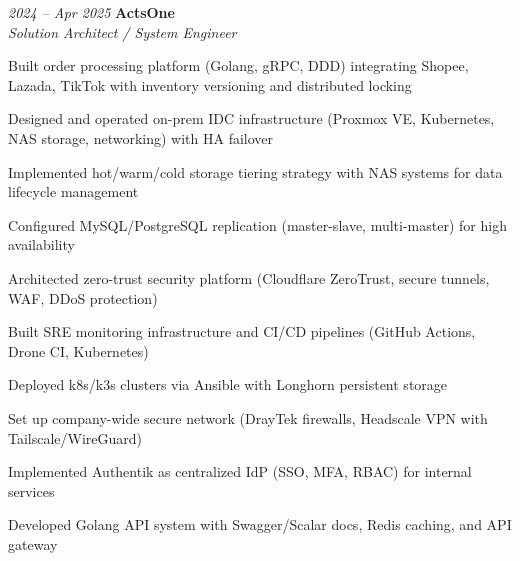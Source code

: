 \vspace{0.2 cm}

\begin{twocolentry}{\textit{2024 -- Apr 2025}}
    \textbf{ActsOne} \\[4pt]
    \textit{Solution Architect / System Engineer}
\end{twocolentry}
\begin{onecolentry}
    \begin{highlights}
        \item Built order processing platform (Golang, gRPC, DDD) integrating Shopee, Lazada, TikTok with inventory versioning and distributed locking
        \item Designed and operated on-prem IDC infrastructure (Proxmox VE, Kubernetes, NAS storage, networking) with HA failover
        \item Implemented hot/warm/cold storage tiering strategy with NAS systems for data lifecycle management
        \item Configured MySQL/PostgreSQL replication (master-slave, multi-master) for high availability
        \item Architected zero-trust security platform (Cloudflare ZeroTrust, secure tunnels, WAF, DDoS protection)
        \item Built SRE monitoring infrastructure and CI/CD pipelines (GitHub Actions, Drone CI, Kubernetes)
        \item Deployed k8s/k3s clusters via Ansible with Longhorn persistent storage
        \item Set up company-wide secure network (DrayTek firewalls, Headscale VPN with Tailscale/WireGuard)
        \item Implemented Authentik as centralized IdP (SSO, MFA, RBAC) for internal services
        \item Developed Golang API system with Swagger/Scalar docs, Redis caching, and API gateway
    \end{highlights}
\end{onecolentry}
\vspace{0.2 cm}

